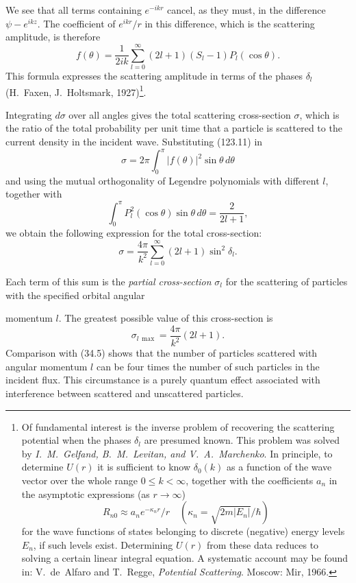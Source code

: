 We see that all terms containing $e^{-ikr}$ cancel, as they must, in the
difference $\psi-e^{ikz}$. The coefficient of $e^{ikr}/r$ in this difference,
which is the scattering amplitude, is therefore
\begin{equation}
 f(\theta)=\frac1{2ik}\sum_{l=0}^\infty(2l+1)(S_l-1)P_l(\cos\theta).
 \tag{123.11}
\end{equation}
This formula expresses the scattering amplitude in terms of the phases
$\delta_l$ (H.~Faxen, J.~Holtsmark, 1927)\footnote{Of fundamental interest is
the inverse problem of recovering the scattering potential when the phases
$\delta_l$ are presumed known. This problem was solved by
\emph{I.~M.~Gelfand, B.~M.~Levitan, and V.~A.~Marchenko}. In principle, to
determine $U(r)$ it is sufficient to know $\delta_0(k)$ as a function of the
wave vector over the whole range $0\leq k<\infty$, together with the
coefficients $a_n$ in the asymptotic expressions (as $r\to\infty$)
\[
 R_{n0}\approx a_ne^{-\kappa_nr}/r
 \quad(\kappa_n=\sqrt{2m|E_n|}/\hbar)
\]
for the wave functions of states belonging to discrete (negative) energy
levels $E_n$, if such levels exist. Determining $U(r)$ from these data reduces
to solving a certain linear integral equation. A systematic account may be
found in: V.~de~Alfaro and T.~Regge, \emph{Potential Scattering}. Moscow: Mir,
1966.}.

Integrating $d\sigma$ over all angles gives the total scattering
cross-section $\sigma$, which is the ratio of the total probability per unit
time that a particle is scattered to the current density in the incident
wave. Substituting (123.11) in
\[
 \sigma=2\pi\int_0^\pi|f(\theta)|^2\sin\theta\,d\theta
\]
and using the mutual orthogonality of Legendre polynomials with different
$l$, together with
\[
 \int_0^\pi P_l^2(\cos\theta)\sin\theta\,d\theta=\frac2{2l+1},
\]
we obtain the following expression for the total cross-section:
\begin{equation}
 \sigma=\frac{4\pi}{k^2}\sum_{l=0}^\infty(2l+1)\sin^2\delta_l.
 \tag{123.12}
\end{equation}

Each term of this sum is the \emph{partial cross-section} $\sigma_l$ for the
scattering of particles with the specified orbital angular

momentum $l$. The greatest possible value of this cross-section is
\begin{equation}
 \sigma_{l\,\max}=\frac{4\pi}{k^2}(2l+1).
 \tag{123.13}
\end{equation}
Comparison with (34.5) shows that the number of particles scattered with
angular momentum $l$ can be four times the number of such particles in the
incident flux. This circumstance is a purely quantum effect associated with
interference between scattered and unscattered particles.

